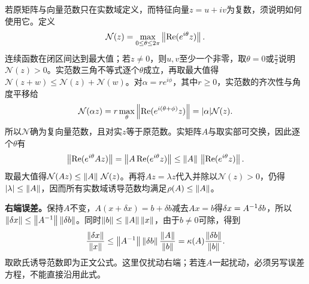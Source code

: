 若原矩阵与向量范数只在实数域定义，而特征向量$z=u+iv$为复数，须说明如何使用它。定义
\[\mathcal N(z)=\max_{0\le\theta\le2\pi}\left\lVert\operatorname{Re}(e^{i\theta}z)\right\rVert.\]
连续函数在闭区间达到最大值；若$z\ne0$，则$u,v$至少一个非零，取$\theta=0$或$\frac{\pi}{2}$说明$\mathcal N(z)>0$。实范数三角不等式逐个$\theta$成立，再取最大值得$\mathcal N(z+w)\le\mathcal N(z)+\mathcal N(w)$。对$\alpha=re^{i\phi}$，其中$r\ge0$，实范数的齐次性与角度平移给
\[\mathcal N(\alpha z)=r\max_\theta\left\lVert\operatorname{Re}(e^{i(\theta+\phi)}z)\right\rVert=|\alpha|\mathcal N(z).\]
所以$\mathcal N$确为复向量范数，且对实$z$等于原范数。实矩阵$A$与取实部可交换，因此逐个$\theta$有
\[\left\lVert\operatorname{Re}(e^{i\theta}Az)\right\rVert
=\left\lVert A\operatorname{Re}(e^{i\theta}z)\right\rVert
\le\left\lVert A\right\rVert\,\left\lVert\operatorname{Re}(e^{i\theta}z)\right\rVert.\]
取最大值得$\mathcal N(Az)\le\left\lVert A\right\rVert\,\mathcal N(z)$。再将$Az=\lambda z$代入并除以$\mathcal N(z)>0$，仍得$|\lambda|\le\left\lVert A\right\rVert$，因而所有实数域诱导范数均满足$\rho(A)\le\left\lVert A\right\rVert$。

\textbf{右端误差。}保持$A$不变，$A(x+\delta x)=b+\delta b$减去$Ax=b$得$\delta x=A^{-1}\delta b$，所以$\left\lVert\delta x\right\rVert\le\left\lVert A^{-1}\right\rVert\left\lVert\delta b\right\rVert$。同时$\left\lVert b\right\rVert\le\left\lVert A\right\rVert\left\lVert x\right\rVert$，由于$b\ne0$可除，得到
\[\dfrac{\left\lVert\delta x\right\rVert}{\left\lVert x\right\rVert}\le\left\lVert A^{-1}\right\rVert\left\lVert\delta b\right\rVert\dfrac{\left\lVert A\right\rVert}{\left\lVert b\right\rVert}=\kappa(A)\dfrac{\left\lVert\delta b\right\rVert}{\left\lVert b\right\rVert}.\]
取欧氏诱导范数即为正文公式。这里仅扰动右端；若连$A$一起扰动，必须另写误差方程，不能直接沿用此式。
